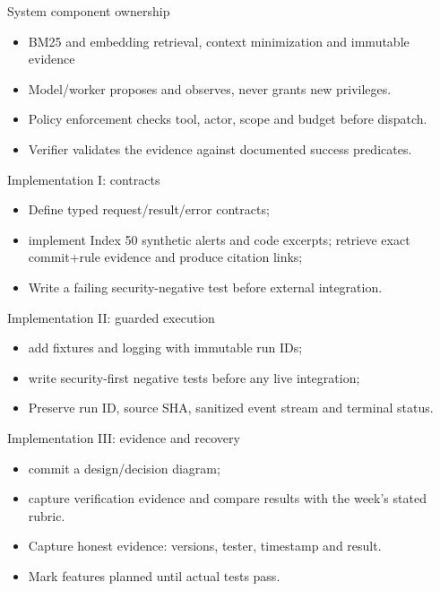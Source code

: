 \documentclass[aspectratio=169,10pt]{beamer}
\begin{document}
\begin{frame}{System component ownership}
\small
\begin{itemize}
\item BM25 and embedding retrieval, context minimization and immutable evidence
\item Model/worker proposes and observes, never grants new privileges.
\item Policy enforcement checks tool, actor, scope and budget before dispatch.
\item Verifier validates the evidence against documented success predicates.
\end{itemize}

\end{frame}

\begin{frame}{Implementation I: contracts}
\small
\begin{itemize}
\item Define typed request/result/error contracts;
\item implement Index 50 synthetic alerts and code excerpts; retrieve exact commit+rule evidence and produce citation links;
\item Write a failing security-negative test before external integration.
\end{itemize}

\end{frame}

\begin{frame}{Implementation II: guarded execution}
\small
\begin{itemize}
\item add fixtures and logging with immutable run IDs;
\item write security-first negative tests before any live integration;
\item Preserve run ID, source SHA, sanitized event stream and terminal status.
\end{itemize}

\end{frame}

\begin{frame}{Implementation III: evidence and recovery}
\small
\begin{itemize}
\item commit a design/decision diagram;
\item capture verification evidence and compare results with the week's stated rubric.
\item Capture honest evidence: versions, tester, timestamp and result.
\item Mark features planned until actual tests pass.
\end{itemize}

\end{frame}
\end{document}
